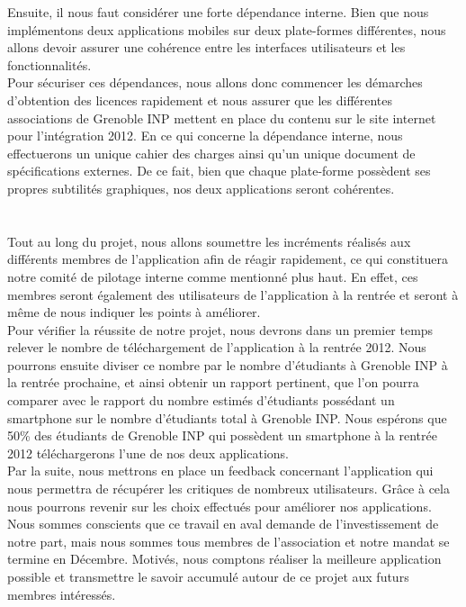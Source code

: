 \documentclass[a4paper,11pt]{article}
\begin{document}
\indent Ensuite, il nous faut  considérer une forte dépendance interne. Bien que nous implémentons deux applications mobiles sur deux plate-formes différentes, nous allons devoir assurer une cohérence entre les interfaces utilisateurs et les fonctionnalités.\\
\indent Pour sécuriser ces dépendances, nous allons donc commencer les démarches d'obtention des licences rapidement et nous assurer que les différentes associations de Grenoble INP mettent en place du contenu sur le site internet pour l’intégration 2012. En ce qui concerne la dépendance interne, nous effectuerons un unique cahier des charges ainsi qu’un unique document de spécifications externes. De ce fait, bien que chaque plate-forme possèdent ses propres subtilités graphiques, nos deux applications seront cohérentes.\\
\\
\\
\indent Tout au long du projet, nous allons soumettre les incréments réalisés aux différents membres de l'application afin de réagir rapidement, ce qui constituera notre comité de pilotage interne comme mentionné plus haut. En effet, ces membres seront également des utilisateurs de l'application à la rentrée et seront à même de nous indiquer les points à améliorer. \\
Pour vérifier la réussite de notre projet, nous devrons dans un premier temps relever le nombre de téléchargement de l’application à la rentrée 2012. Nous pourrons ensuite diviser ce nombre par le nombre d'étudiants à Grenoble INP à la rentrée prochaine, et ainsi obtenir un rapport pertinent, que l'on pourra comparer avec le rapport du nombre estimés d'étudiants possédant un smartphone sur le nombre d'étudiants total à Grenoble INP. Nous espérons que 50\% des étudiants de Grenoble INP qui possèdent un smartphone à la rentrée 2012 téléchargerons l'une de nos deux applications.\\
\indent Par la suite, nous mettrons en place un feedback concernant l’application qui nous permettra de récupérer les critiques de nombreux utilisateurs. Grâce à cela nous pourrons revenir sur les choix effectués pour améliorer nos applications. Nous sommes conscients que ce travail en aval demande de l’investissement de notre part, mais nous sommes tous membres de l’association et notre mandat se termine en Décembre. Motivés, nous comptons réaliser la meilleure application possible et transmettre le savoir accumulé autour de ce projet aux futurs membres intéressés.
\end{document}
